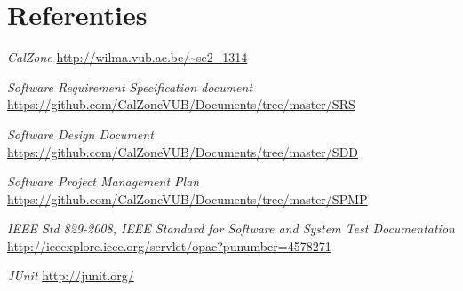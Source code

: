 \chapter{Referenties}
\begingroup
\renewcommand{\chapter}[2]{}%
\begin{thebibliography}{99}

	 \emph{CalZone} \url{http://wilma.vub.ac.be/~se2_1314}
	
     \emph{Software Requirement Specification document} \url{https://github.com/CalZoneVUB/Documents/tree/master/SRS}
    
     \emph{Software Design Document} \url{https://github.com/CalZoneVUB/Documents/tree/master/SDD}
    
     \emph{Software Project Management Plan} \url{https://github.com/CalZoneVUB/Documents/tree/master/SPMP}
    
     \emph{IEEE Std 829-2008\texttrademark \space, IEEE Standard for Software and System Test Documentation} \url{http://ieeexplore.ieee.org/servlet/opac?punumber=4578271}
    
     \emph{JUnit} \url{http://junit.org/}

\end{thebibliography}

\endgroup